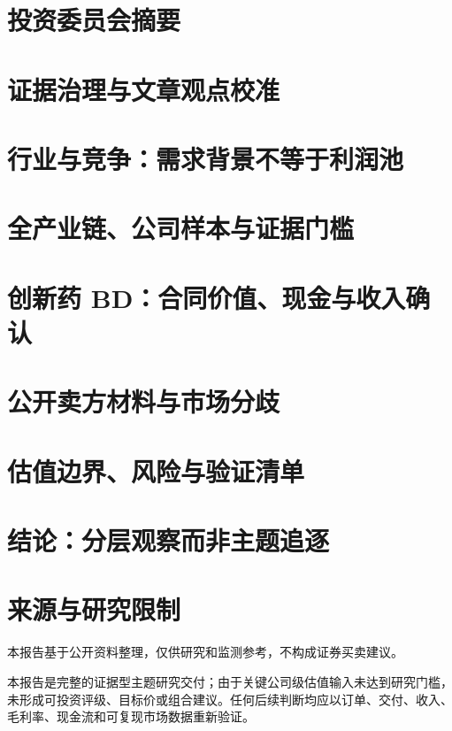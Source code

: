 \documentclass[a4paper,11pt,openany,fontset=none]{ctexrep}
\newcommand{\reportdisclaimer}{本报告基于公开资料整理，仅供研究和监测参考，不构成证券买卖建议。}
\begin{document}
\astockcover
\tableofcontents\clearpage
\chapter{投资委员会摘要}
\chapter{证据治理与文章观点校准}
\chapter{行业与竞争：需求背景不等于利润池}
\chapter{全产业链、公司样本与证据门槛}
\chapter{创新药 BD：合同价值、现金与收入确认}
\chapter{公开卖方材料与市场分歧}
\chapter{估值边界、风险与验证清单}
\chapter{结论：分层观察而非主题追逐}
\appendix
\chapter{来源与研究限制}
\clearpage\thispagestyle{empty}\vspace*{4cm}
\begin{disclosurebox}[免责声明]\small
\reportdisclaimer\par 本报告是完整的证据型主题研究交付；由于关键公司级估值输入未达到研究门槛，未形成可投资评级、目标价或组合建议。任何后续判断均应以订单、交付、收入、毛利率、现金流和可复现市场数据重新验证。
\end{disclosurebox}
\end{document}
